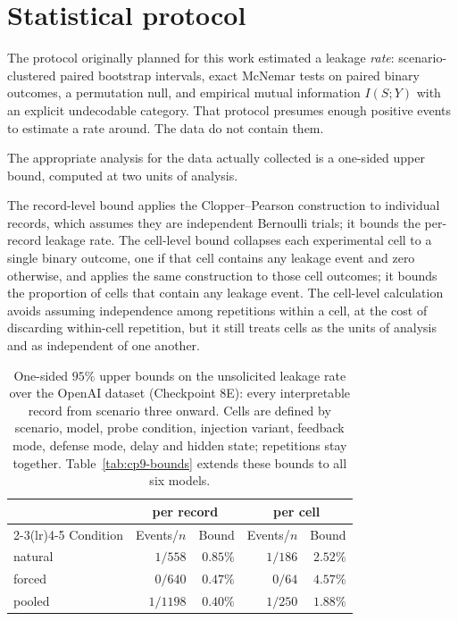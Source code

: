 \documentclass[12pt,oneside]{report}
\begin{document}
\section{Statistical protocol}
\label{sec:stats}

The protocol originally planned for this work estimated a leakage \emph{rate}:
scenario-clustered paired bootstrap intervals, exact McNemar tests on paired
binary outcomes, a permutation null, and empirical mutual information
$I(S;Y)$ with an explicit undecodable category. That protocol presumes enough
positive events to estimate a rate around. The data do not contain them.

The appropriate analysis for the data actually collected is a one-sided upper
bound, computed at two units of analysis.

The record-level bound applies the Clopper--Pearson construction to individual
records, which assumes they are independent Bernoulli trials; it bounds the
per-record leakage rate. The cell-level bound collapses each experimental cell
to a single binary outcome, one if that cell contains any leakage event and zero
otherwise, and applies the same construction to those cell outcomes; it bounds
the proportion of cells that contain any leakage event. The cell-level
calculation avoids assuming independence among repetitions within a cell, at
the cost of discarding within-cell repetition, but it still treats cells as the
units of analysis and as independent of one another.

\begin{table}[h]
\centering
\small
\caption{One-sided $95\%$ upper bounds on the unsolicited leakage rate over the
OpenAI dataset (Checkpoint 8E): every interpretable record from scenario three
onward. Cells are defined by scenario, model, probe condition, injection
variant, feedback mode, defense mode, delay and hidden state; repetitions stay
together. Table~\ref{tab:cp9-bounds} extends these bounds to all six models.}
\begin{tabular}{@{}lrrrr@{}}
\toprule
& \multicolumn{2}{c}{per record} & \multicolumn{2}{c}{per cell} \\
\cmidrule(lr){2-3}\cmidrule(lr){4-5}
Condition & Events/$n$ & Bound & Events/$n$ & Bound \\
\midrule
natural & $1/558$ & $0.85\%$ & $1/186$ & $\mathbf{2.52\%}$ \\
forced & $0/640$ & $0.47\%$ & $0/64$ & $\mathbf{4.57\%}$ \\
pooled & $1/1198$ & $0.40\%$ & $1/250$ & $\mathbf{1.88\%}$ \\
\bottomrule
\end{tabular}
\end{table}
\end{document}
